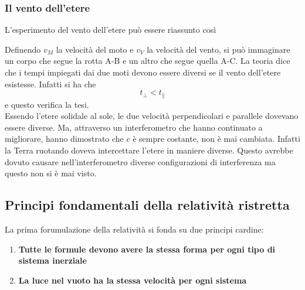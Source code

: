 \subsubsection{Il vento dell'etere}
L'esperimento del vento dell'etere può essere riassunto così
\begin{center}
\end{center}
Definendo $v_M$ la velocità del moto e $v_V$ la velocità del vento, si può immaginare un corpo che
segue la rotta A-B e un altro che segue quella A-C. La teoria dice che i tempi impiegati dai due 
moti devono essere diversi se il vento dell'etere esistesse. Infatti si ha che
\begin{equation*}
  t_\perp<t_\|
\end{equation*}
e questo verifica la tesi.\\ [\baselineskip]
Essendo l'etere solidale al sole, le due velocità perpendicolari e parallele dovevano essere
diverse. Ma, attraverso un interferometro che hanno continuato a migliorare, hanno dimostrato che
$c$ è sempre costante, non è mai cambiata. Infatti la Terra ruotando doveva intercettare l'etere
in maniere diverse. Questo avrebbe dovuto causare nell'interferometro diverse configurazioni di
interferenza ma questo non si è mai visto.

\subsection{Principi fondamentali della relatività ristretta}
La prima forumulazione della relatività si fonda su due principi cardine:
\begin{enumerate}
  \item \textbf{Tutte le formule devono avere la stessa forma per ogni tipo di sistema inerziale}
  \item \textbf{La luce nel vuoto ha la stessa velocità per ogni sistema} 
\end{enumerate}

